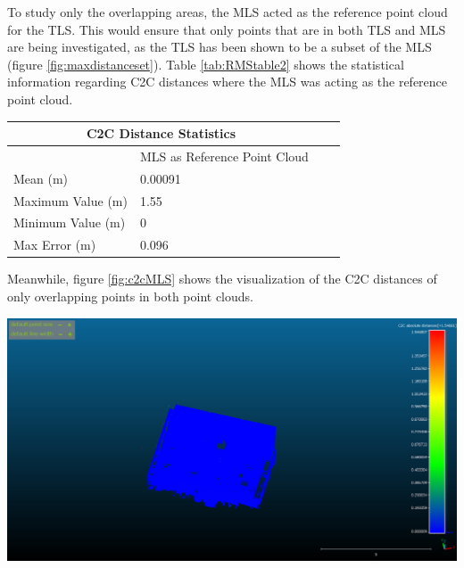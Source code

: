 \documentclass[man]{apa7}
\begin{document}
To study only the overlapping areas, the MLS acted as the reference point cloud for the TLS. This would ensure that only points that are in both TLS and MLS are being investigated, as the TLS has been shown to be a subset of the MLS (figure \ref{fig:maxdistanceset}). Table \ref{tab:RMStable2} shows the statistical information regarding C2C distances where the MLS was acting as the reference point cloud. 

\vspace{2em}

\begin{minipage}{\linewidth}
  \small
  \setlength{\tabcolsep}{3pt} %
  \renewcommand{\arraystretch}{0.8} %
  \label{tab:RMStable2}
  \begin{tabular}{@{}llrr@{}}         \toprule
  \multicolumn{2}{c}{C2C Distance Statistics }        \\ \toprule{}
  &  MLS as Reference Point Cloud \\ \midrule
  Mean (m)      & 0.00091 \\
  Maximum Value (m)       & 1.55\\
  Minimum Value (m)       & 0  \\ 
  Max Error (m) & 0.096 \\\bottomrule
  \end{tabular}
\end{minipage}

\vspace{2em}

 Meanwhile, figure \ref{fig:c2cMLS} shows the visualization of the C2C distances of only overlapping points in both point clouds.

 \newpage

 \begin{minipage}{\linewidth}
  \includegraphics[height=\textheight/2 ,width=\textwidth/1]{figures/MLSasReference.png}
  \label{fig:c2cMLS}
\end{minipage}
\end{document}
